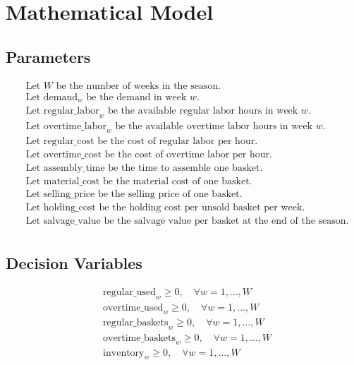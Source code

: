 \documentclass{article}
\begin{document}
\section*{Mathematical Model}

\subsection*{Parameters}
\begin{align*}
    & \text{Let } W \text{ be the number of weeks in the season.} \\
    & \text{Let } \text{demand}_w \text{ be the demand in week } w. \\
    & \text{Let } \text{regular\_labor}_w \text{ be the available regular labor hours in week } w. \\
    & \text{Let } \text{overtime\_labor}_w \text{ be the available overtime labor hours in week } w. \\
    & \text{Let regular\_cost be the cost of regular labor per hour.} \\
    & \text{Let overtime\_cost be the cost of overtime labor per hour.} \\
    & \text{Let assembly\_time be the time to assemble one basket.} \\
    & \text{Let material\_cost be the material cost of one basket.} \\
    & \text{Let selling\_price be the selling price of one basket.} \\
    & \text{Let holding\_cost be the holding cost per unsold basket per week.} \\
    & \text{Let salvage\_value be the salvage value per basket at the end of the season.} \\
\end{align*}

\subsection*{Decision Variables}
\begin{align*}
    & \text{regular\_used}_w \geq 0, \quad \forall w = 1, \ldots, W \\
    & \text{overtime\_used}_w \geq 0, \quad \forall w = 1, \ldots, W \\
    & \text{regular\_baskets}_w \geq 0, \quad \forall w = 1, \ldots, W \\
    & \text{overtime\_baskets}_w \geq 0, \quad \forall w = 1, \ldots, W \\
    & \text{inventory}_w \geq 0, \quad \forall w = 1, \ldots, W \\
\end{align*}
\end{document}
